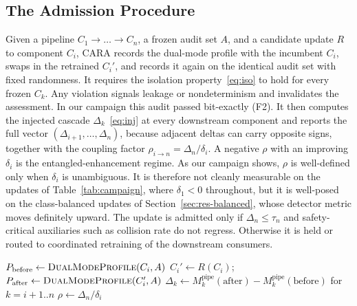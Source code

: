 \documentclass[conference]{IEEEtran}
\begin{document}
\subsection{The Admission Procedure}
Given a pipeline $C_1 \to \dots \to C_n$, a frozen audit set $A$, and a
candidate update $R$ to component $C_i$, CARA records the dual-mode profile with
the incumbent $C_i$, swaps in the retrained $C_i'$, and records it again on the
identical audit set with fixed randomness. It requires the isolation
property~\eqref{eq:iso} to hold for every frozen $C_k$. Any violation signals
leakage or nondeterminism and invalidates the assessment. In our campaign this
audit passed bit-exactly (F2). It then computes the injected cascade
$\Delta_k$~\eqref{eq:inj} at every downstream component and reports the full
vector $(\Delta_{i+1}, \dots, \Delta_n)$, because adjacent deltas can carry
opposite signs, together with the coupling factor $\rho_{i\to n} = \Delta_n /
\delta_i$. A negative $\rho$ with an improving $\delta_i$ is the
entangled-enhancement regime. As our campaign shows, $\rho$ is well-defined only
when $\delta_i$ is unambiguous. It is therefore not cleanly measurable on the
updates of Table~\ref{tab:campaign}, where $\delta_1 < 0$ throughout, but it is
well-posed on the class-balanced updates of Section~\ref{sec:res-balanced}, whose
detector metric moves definitely upward.
The update is admitted only if $\Delta_n \le \tau_n$ and safety-critical
auxiliaries such as collision rate do not regress. Otherwise it is held or routed
to coordinated retraining of the downstream consumers.

\begin{algorithm}[htbp]
\SetAlgoLined
\DontPrintSemicolon
{}
$P_{\text{before}} \leftarrow \textsc{DualModeProfile}(C_i, A)$\;
$C_i' \leftarrow R(C_i)$;\quad
$P_{\text{after}} \leftarrow \textsc{DualModeProfile}(C_i', A)$\;
$\Delta_k \leftarrow M_k^{\text{pipe}}(\text{after})-M_k^{\text{pipe}}(\text{before})$
for $k=i{+}1..n$\;
$\rho \leftarrow \Delta_n / \delta_i$\;
\caption{Cascade-Aware Retraining Assessment (CARA)}
\label{alg:cara}
\end{algorithm}
\end{document}

